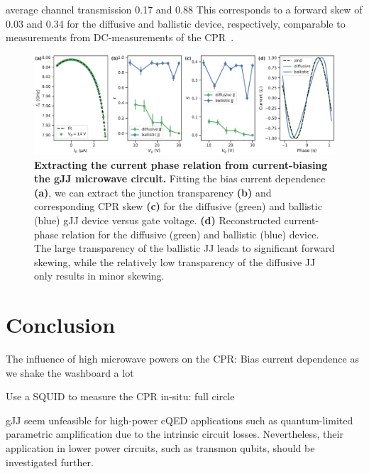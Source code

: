 average channel transmission 0.17 and 0.88
This corresponds to a forward skew of 0.03 and 0.34 for the diffusive and ballistic device, respectively, comparable to measurements from DC-measurements of the CPR~\cite{englishObservationNonsinusoidalCurrentphase2016,nandaCurrentPhaseRelationBallistic2017}.
%
%

\begin{figure}
	\centering
	\includegraphics[width=\linewidth]{chapter-gJJ-CPR/figs/Figure5}
	\caption{
		\textbf{Extracting the current phase relation from current-biasing the gJJ microwave circuit.}
		Fitting the bias current dependence \textbf{(a)}, we can extract the junction transparency \textbf{(b)} and corresponding CPR skew \textbf{(c)} for the diffusive (green) and ballistic (blue) gJJ device versus gate voltage.
		\textbf{(d)} Reconstructed current-phase relation for the diffusive (green) and ballistic (blue) device.
		The large transparency of the ballistic JJ leads to significant forward skewing, while the relatively low transparency of the diffusive JJ only results in minor skewing.
	}
	\label{fig:figure5}
\end{figure}

\section{Conclusion}

The influence of high microwave powers on the CPR: Bias current dependence as we shake the washboard a lot

Use a SQUID to measure the CPR in-situ: full circle

gJJ seem unfeasible for high-power cQED applications such as quantum-limited parametric amplification due to the intrinsic circuit losses.
%
Nevertheless, their application in lower power circuits, such as transmon qubits, should be investigated further.



